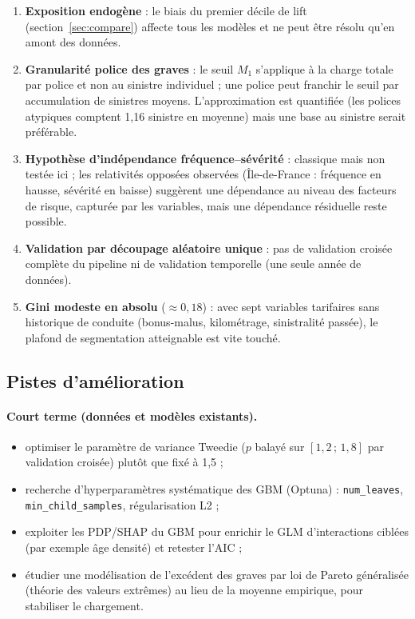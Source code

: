 \documentclass[11pt,a4paper]{article}
\begin{document}
\begin{enumerate}
    \item \textbf{Exposition endogène} : le biais du premier décile de lift (section~\ref{sec:compare}) affecte tous les modèles et ne peut être résolu qu'en amont des données.
    \item \textbf{Granularité police des graves} : le seuil $M_1$ s'applique à la charge totale par police et non au sinistre individuel ; une police peut franchir le seuil par accumulation de sinistres moyens. L'approximation est quantifiée (les polices atypiques comptent 1{,}16 sinistre en moyenne) mais une base au sinistre serait préférable.
    \item \textbf{Hypothèse d'indépendance fréquence--sévérité} : classique mais non testée ici ; les relativités opposées observées (Île-de-France : fréquence en hausse, sévérité en baisse) suggèrent une dépendance au niveau des facteurs de risque, capturée par les variables, mais une dépendance résiduelle reste possible.
    \item \textbf{Validation par découpage aléatoire unique} : pas de validation croisée complète du pipeline ni de validation temporelle (une seule année de données).
    \item \textbf{Gini modeste en absolu} ($\approx 0{,}18$) : avec sept variables tarifaires sans historique de conduite (bonus-malus, kilométrage, sinistralité passée), le plafond de segmentation atteignable est vite touché.
\end{enumerate}

\subsection{Pistes d'amélioration}

\paragraph{Court terme (données et modèles existants).}
\begin{itemize}
    \item optimiser le paramètre de variance Tweedie ($p$ balayé sur $[1{,}2 \,;\, 1{,}8]$ par validation croisée) plutôt que fixé à 1{,}5 ;
    \item recherche d'hyperparamètres systématique des GBM (Optuna) : \texttt{num\_leaves}, \texttt{min\_child\_samples}, régularisation L2 ;
    \item exploiter les PDP/SHAP du GBM pour enrichir le GLM d'interactions ciblées (par exemple âge \texttimes{} densité) et retester l'AIC ;
    \item étudier une modélisation de l'excédent des graves par loi de Pareto généralisée (théorie des valeurs extrêmes) au lieu de la moyenne empirique, pour stabiliser le chargement.
\end{itemize}
\end{document}
